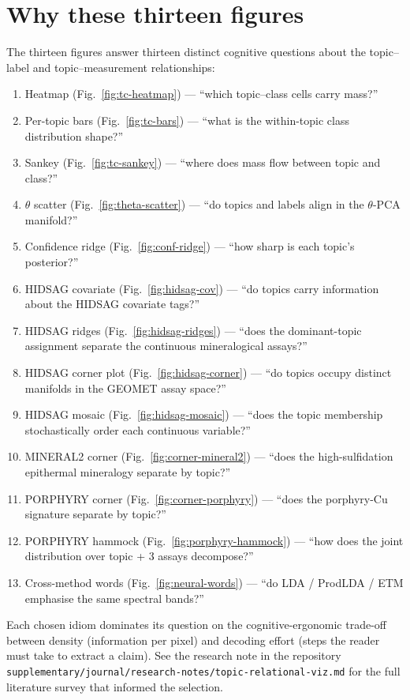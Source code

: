 \documentclass[11pt,a4paper]{article}
\begin{document}
\section{Why these thirteen figures}

The thirteen figures answer thirteen distinct cognitive questions
about the topic--label and topic--measurement relationships:

\begin{enumerate}
\item Heatmap (Fig.~\ref{fig:tc-heatmap}) --- ``which topic--class
cells carry mass?''
\item Per-topic bars (Fig.~\ref{fig:tc-bars}) --- ``what is the
within-topic class distribution shape?''
\item Sankey (Fig.~\ref{fig:tc-sankey}) --- ``where does mass flow
between topic and class?''
\item $\theta$ scatter (Fig.~\ref{fig:theta-scatter}) --- ``do
topics and labels align in the $\theta$-PCA manifold?''
\item Confidence ridge (Fig.~\ref{fig:conf-ridge}) --- ``how sharp
is each topic's posterior?''
\item HIDSAG covariate (Fig.~\ref{fig:hidsag-cov}) --- ``do topics
carry information about the HIDSAG covariate tags?''
\item HIDSAG ridges (Fig.~\ref{fig:hidsag-ridges}) --- ``does the
dominant-topic assignment separate the continuous mineralogical
assays?''
\item HIDSAG corner plot (Fig.~\ref{fig:hidsag-corner}) --- ``do
topics occupy distinct manifolds in the GEOMET assay space?''
\item HIDSAG mosaic (Fig.~\ref{fig:hidsag-mosaic}) --- ``does the
topic membership stochastically order each continuous variable?''
\item MINERAL2 corner (Fig.~\ref{fig:corner-mineral2}) --- ``does
the high-sulfidation epithermal mineralogy separate by topic?''
\item PORPHYRY corner (Fig.~\ref{fig:corner-porphyry}) --- ``does
the porphyry-Cu signature separate by topic?''
\item PORPHYRY hammock (Fig.~\ref{fig:porphyry-hammock}) --- ``how
does the joint distribution over topic + 3 assays decompose?''
\item Cross-method words (Fig.~\ref{fig:neural-words}) --- ``do
LDA / ProdLDA / ETM emphasise the same spectral bands?''
\end{enumerate}

Each chosen idiom dominates its question on the cognitive-ergonomic
trade-off between density (information per pixel) and decoding
effort (steps the reader must take to extract a claim). See the
research note in the repository
\texttt{supplementary/journal/research-notes/topic-relational-viz.md}
for the full literature survey that informed the selection.



\end{document}
